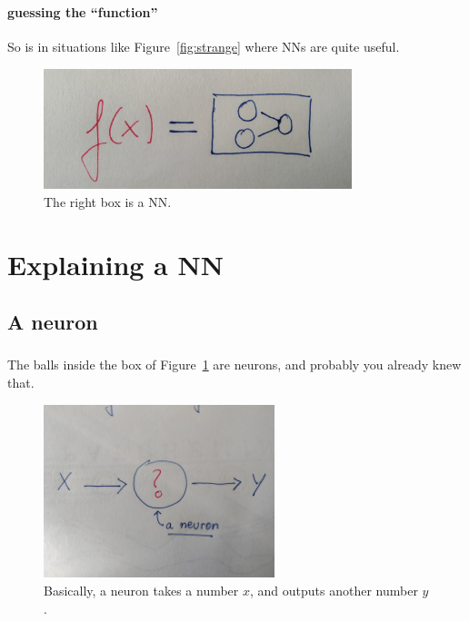 \documentclass{beamer}
\begin{document}
\begin{frame}
    \frametitle{\insertsection}
    \framesubtitle{guessing the ``function'' }

    So is in situations like Figure~\ref{fig:strange} where NNs are quite useful.

    \begin{figure}
        \centering
        \includegraphics[width=0.8\textwidth]{img/fx-nn.jpg}
        \caption{The right box is a NN.}
        \label{fig:fx-nn}
    \end{figure}
\end{frame}


\section{Explaining a NN}
\subsection{A neuron}
\begin{frame}
    \frametitle{\insertsection}
    \framesubtitle{\insertsubsection}

    The balls inside the box of Figure~\ref{fig:fx-nn} are neurons, and probably you already knew that.

    \begin{figure}
        \centering
        \includegraphics[width=0.6\textwidth]{img/neuron.jpg}
        \caption{Basically, a neuron takes a number $x$, and outputs another number $y$.}
        \label{fig:neuron}
    \end{figure}
\end{frame}
\end{document}
